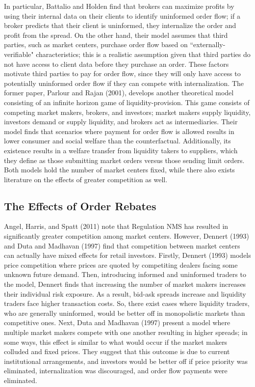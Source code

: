 \documentclass[12pt,a4paper]{article}
\begin{document}
In particular, Battalio and Holden find that brokers can maximize profits by using their internal data on their clients to identify uninformed order flow; if a broker predicts that their client is uninformed, they internalize the order and profit from the spread. On the other hand, their model assumes that third parties, such as market centers, purchase order flow based on ``externally-verifiable" characteristics; this is a realistic assumption given that third parties do not have access to client data before they purchase an order. These factors motivate third parties to pay for order flow, since they will only have access to potentially uninformed order flow if they can compete with internalization. The former paper, Parlour and Rajan (2001), develops another theoretical model consisting of an infinite horizon game of liquidity-provision. This game consists of competing market makers, brokers, and investors; market makers supply liquidity, investors demand or supply liquidity, and brokers act as intermediaries. Their model finds that scenarios where payment for order flow is allowed results in lower consumer and social welfare than the counterfactual. Additionally, its existence results in a welfare transfer from liquidity takers to suppliers, which they define as those submitting market orders versus those sending limit orders. Both models hold the number of market centers fixed, while there also exists literature on the effects of greater competition as well. 

\subsection{The Effects of Order Rebates}

Angel, Harris, and Spatt (2011) note that Regulation NMS has resulted in significantly greater competition among market centers. However, Dennert (1993) and Duta and Madhavan (1997) find that competition between market centers can actually have mixed effects for retail investors. Firstly, Dennert (1993) models price competition where prices are quoted by competiting dealers facing some unknown future demand. Then, introducing informed and uninformed traders to the model, Dennert finds that increasing the number of market makers increases their individual risk exposure. As a result, bid-ask spreads increase and liquidity traders face higher transaction costs. So, there exist cases where liquidity traders, who are generally uninformed, would be better off in monopolistic markets than competitive ones. Next, Duta and Madhavan (1997) present a model where multiple market makers compete with one another resulting in higher spreads; in some ways, this effect is similar to what would occur if the market makers colluded and fixed prices. They suggest that this outcome is due to current institutional arrangements, and investors would be better off if price priority was eliminated, internalization was discouraged, and order flow payments were eliminated. 
\end{document}
